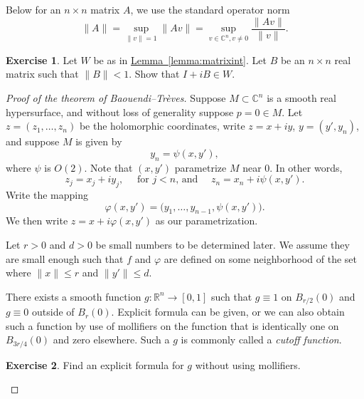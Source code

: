 \documentclass[12pt,openany]{book}
\newcommand{\snorm}[1]{\lVert {#1} \rVert}
\newcommand{\C}{{\mathbb{C}}}
\newcommand{\R}{{\mathbb{R}}}
\newcommand{\myindex}[1]{#1\index{#1}}
\theoremstyle{plain}
\theoremstyle{remark}
\theoremstyle{definition}
\newenvironment{exbox}{%
    \def\FrameCommand{\vrule width 1pt \relax\hspace {10pt}}%
    \MakeFramed {\advance \hsize -\width \FrameRestore }%
}{%
    \endMakeFramed
}
\theoremstyle{exercise}
\newtheorem{exercise}{Exercise}[section]
\theoremstyle{example}
\newcommand{\lemmaref}[1]{\hyperref[#1]{Lemma~\ref*{#1}}}
\begin{document}
Below for an $n \times n$ matrix $A$, we use the standard operator norm
\begin{equation*}
\snorm{A} = \sup_{\snorm{v}=1} \snorm{Av} = \sup_{v \in \C^n, v\not= 0}
\frac{\snorm{Av}}{\snorm{v}} .
\end{equation*}

\begin{exbox}
\begin{exercise}
Let $W$ be as in \lemmaref{lemma:matrixint}.  Let $B$ be an $n \times n$
real matrix such that $\snorm{B} < 1$.   Show that $I + iB \in W$.
\end{exercise}
\end{exbox}

\begin{proof}[Proof of the theorem of Baouendi--Tr{\`e}ves]
Suppose $M \subset \C^n$ is a smooth real hypersurface, and without loss
of generality suppose $p=0 \in M$.
Let $z=(z_1,\ldots,z_n)$ be the holomorphic coordinates, write $z=x+iy$,
$y=(y',y_n)$, and
suppose $M$ is given by
\begin{equation*}
y_n = \psi(x,y') ,
\end{equation*}
where $\psi$ is $O(2)$.
Note that $(x,y')$ parametrize $M$ near 0.  In other words,
\begin{equation*}
z_j = x_j+iy_j , \quad \text{ for $j < n$, and } \quad
z_n = x_n + i \psi(x,y') .
\end{equation*}
Write the mapping
\begin{equation*}
\varphi(x,y') = \bigl(y_1,\ldots,y_{n-1},\psi(x,y')\bigr) .
\end{equation*}
We then write $z = x + i\varphi(x,y')$ as our parametrization.

Let $r > 0$ and $d > 0$ be small numbers to be determined later.
We assume they are small enough such
that $f$ and $\varphi$ are defined on some neighborhood of the
set where $\snorm{x} \leq r$ and $\snorm{y'} \leq d$.

There exists a smooth function $g \colon \R^n \to [0,1]$ such that $g \equiv 1$ on
$B_{r/2}(0)$ and $g \equiv 0$ outside of $B_{r}(0)$.  Explicit formula
can be given, or we can also obtain such a function by use of
mollifiers on the function that is identically one on
$B_{3r/4}(0)$ and zero elsewhere.  Such a $g$ is commonly called a
\emph{\myindex{cutoff function}}.

\begin{exbox}
\begin{exercise}
Find an explicit formula for $g$ without using mollifiers.
\end{exercise}
\end{exbox}


\end{proof}
\end{document}
